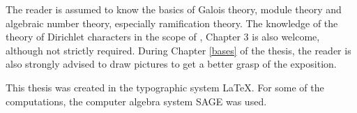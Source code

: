 The reader is assumed to know the basics of Galois theory, module theory and algebraic number theory, especially ramification theory. The knowledge of the theory of Dirichlet characters in the scope of \citep{washington1997}, Chapter 3 is also welcome, although not strictly required. During Chapter \ref{bases} of the thesis, the reader is also strongly advised to draw pictures to get a better grasp of the exposition. \medskip

This thesis was created in the typographic system \LaTeX. For some of the computations, the computer algebra system SAGE was used.




